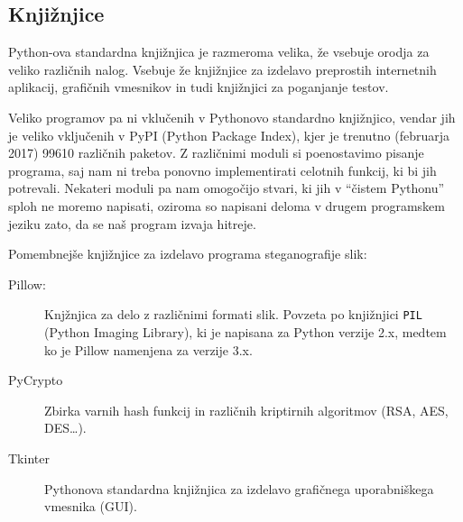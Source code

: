     \subsection{Knjižnjice}
        Python-ova standardna knjižnjica je razmeroma velika, že vsebuje orodja za veliko različnih nalog. Vsebuje že knjižnjice za izdelavo preprostih internetnih aplikacij, grafičnih vmesnikov in tudi knjižnjici za poganjanje testov.

        Veliko programov pa ni vklučenih v Pythonovo standardno knjižnjico, vendar jih je veliko vključenih v PyPI (Python Package Index), kjer je trenutno (februarja 2017) 99610 različnih paketov. Z različnimi moduli si poenostavimo pisanje programa, saj nam ni treba ponovno implementirati celotnih funkcij, ki bi jih potrevali. Nekateri moduli pa nam omogočijo stvari, ki jih v ``čistem Pythonu'' sploh ne moremo napisati, oziroma so napisani deloma v drugem programskem jeziku zato, da se naš program izvaja hitreje.

        Pomembnejše knjižnjice za izdelavo programa steganografije slik:
        \begin{description}
            \item [Pillow:] Knjžnjica za delo z različnimi formati slik. Povzeta po knjižnjici \texttt{PIL} (Python Imaging Library), ki je napisana za Python verzije 2.x, medtem ko je Pillow namenjena za verzije 3.x.
            \item [PyCrypto] Zbirka varnih hash funkcij in različnih kriptirnih algoritmov (RSA, AES, DES\ldots).
            \item [Tkinter] Pythonova standardna knjižnjica za izdelavo grafičnega uporabniškega vmesnika (GUI).
        \end{description}
